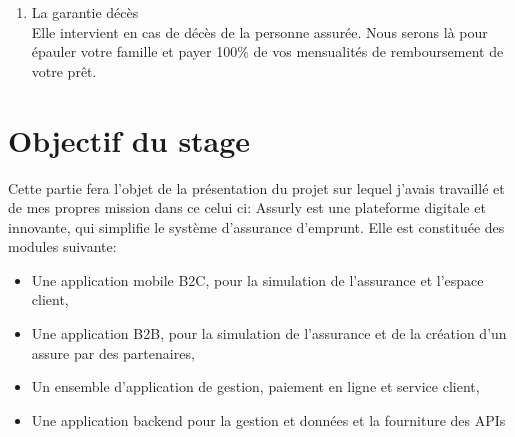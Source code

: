 \begin{enumerate}
\begin{list}{label}{spacing}
\begin{enumerate}
	 	\textbf{La couverture Assurly }: Gigamesh  sera là pour vous épauler et payer 50\% de l’indemnité garantie en cas d’ITT, quelle que soit votre perte de revenu, avec un plafond de 7500€ par mois. Le délai de franchise maximale est de 90 jours après l’interruption de l’activité. Les affections dorsales, psychiques et psychiatriques causant l’IPP sont couvertes sans condition d’hospitalisation
	 	ou d’intervention chirurgicale
	 	\item La garantie Invalidité Permanente Totale (I.P.T.)\\
	 	Elle intervient lorsque la personne assurée est, de
	 	façon définitive, incapable d’exercer strictement son activité professionnelle après la reconnaissance de l’état d’invalidité estimé avec un taux supérieur à 65\%\\
	 	
	 	\textbf{La couverture Assurly} : Gigamesh  sera là pour vous épauler et rembourser 100\% des mensualités du reste de votre prêt avec un plafond de 3 000 000 euros, quelle que soit votre perte de revenu. La garantie invalidité cesse au jour du 65ème anniversaire de l’assuré.
	 \end{enumerate}

\end{list}
\item La garantie décès\\
Elle intervient en cas de décès de la personne assurée. Nous serons là pour épauler votre famille et payer 100\% de vos mensualités de remboursement de votre prêt.

\end{enumerate}

\section{Objectif du stage}
Cette partie fera l’objet de la présentation du projet sur lequel j’avais travaillé et de mes propres mission dans ce celui ci:
Assurly est une plateforme digitale et innovante, qui simplifie le système d’assurance d’emprunt.
Elle est constituée des modules suivante:
\begin{itemize}
\item  Une application mobile B2C, pour la simulation de l’assurance et l’espace client,
\item  Une application B2B, pour la simulation de l’assurance et de la création d’un assure par des partenaires,
\item Un ensemble d’application de gestion, paiement en ligne et service client,
\item Une application backend pour la gestion et données et la fourniture des APIs
\end{itemize}

